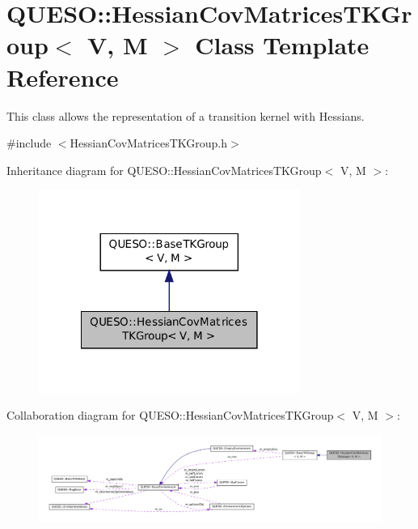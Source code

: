 \hypertarget{class_q_u_e_s_o_1_1_hessian_cov_matrices_t_k_group}{\section{Q\-U\-E\-S\-O\-:\-:Hessian\-Cov\-Matrices\-T\-K\-Group$<$ V, M $>$ Class Template Reference}
\label{class_q_u_e_s_o_1_1_hessian_cov_matrices_t_k_group}
}


This class allows the representation of a transition kernel with Hessians.  




{\ttfamily \#include $<$Hessian\-Cov\-Matrices\-T\-K\-Group.\-h$>$}



Inheritance diagram for Q\-U\-E\-S\-O\-:\-:Hessian\-Cov\-Matrices\-T\-K\-Group$<$ V, M $>$\-:
\nopagebreak
\begin{figure}[H]
\begin{center}
\leavevmode
\includegraphics[width=242pt]{class_q_u_e_s_o_1_1_hessian_cov_matrices_t_k_group__inherit__graph}
\end{center}
\end{figure}


Collaboration diagram for Q\-U\-E\-S\-O\-:\-:Hessian\-Cov\-Matrices\-T\-K\-Group$<$ V, M $>$\-:
\nopagebreak
\begin{figure}[H]
\begin{center}
\leavevmode
\includegraphics[width=350pt]{class_q_u_e_s_o_1_1_hessian_cov_matrices_t_k_group__coll__graph}
\end{center}
\end{figure}
